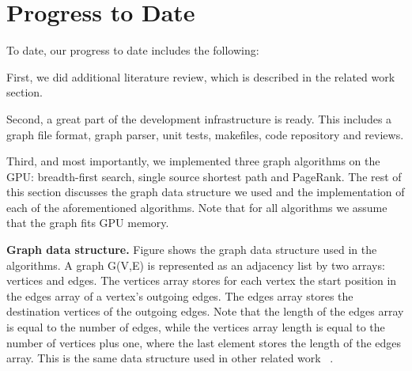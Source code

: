 \documentclass{acm_proc_article-sp}[12pt]
\begin{document}
\section{Progress to Date}
\label{sec:progress}

To date, our progress to date includes the following:

First, we did additional literature review, which is described in the related work section.

Second, a great part of the development infrastructure is ready. This includes a graph file format, graph parser, unit tests, makefiles, code repository and reviews.

Third, and most importantly, we implemented three graph algorithms on the GPU: breadth-first search, single source shortest path and PageRank. The rest of this section discusses the graph data structure we used and the implementation of each of the aforementioned algorithms. Note that for all algorithms we assume that the graph fits GPU memory.

\textbf{Graph data structure.} Figure  shows the graph data structure used in the algorithms. A graph G(V,E) is represented as an adjacency list by two arrays: vertices and edges. The vertices array stores for each vertex the start position in the edges array of a vertex's outgoing edges. The edges array stores the destination vertices of the outgoing edges. Note that the length of the edges array is equal to the number of edges, while the vertices array length is equal to the number of vertices plus one, where the last element stores the length of the  edges array. This is the same data structure used in other related work ~\cite{Harish2007, Sungpack2010}.



\end{document}
